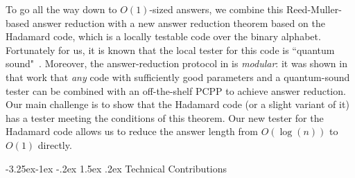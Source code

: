 \documentclass[10pt,a4paper]{article}
\makeatletter
\renewcommand{\subsection}{\@startsection{subsection}{2}{\z@}%
             {-3.25ex\@plus -1ex \@minus -.2ex}%
             {1.5ex \@plus .2ex}%
             {\normalfont\large\scshape\bfseries}}
\theoremstyle{plain}
\theoremstyle{definition}
\newcommand{\1}{\mathbb{1}} %
\makeatother
\begin{document}
To go all the way down to $O(1)$-sized answers, we combine this Reed-Muller-based answer reduction with a new answer reduction theorem based on the Hadamard code, which is a locally testable code over the binary alphabet. Fortunately for us, it is known that the local tester for this code is ``quantum sound"~\cite{ito2012,NV17}. Moreover, the answer-reduction protocol in \cite{neexp} is \emph{modular}: it was shown in that work that \emph{any} code with sufficiently good parameters and a quantum-sound tester can be combined with an off-the-shelf PCPP to achieve answer reduction. Our main challenge is to show that the Hadamard code (or a slight variant of it) has a tester meeting the conditions of this theorem. Our new tester for the Hadamard code allows us to reduce the answer length from 
$O(\log(n))$ to $O(1)$ directly.



%
\subsection{Technical Contributions}
\label{sec:technical_contribution}
\end{document}
